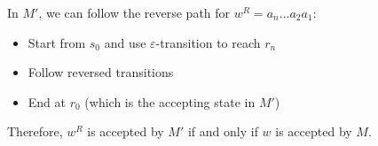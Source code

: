 \documentclass{article}
\begin{document}
In $M'$, we can follow the reverse path for $w^R = a_n...a_2a_1$:
\begin{itemize}
    \item Start from $s_0$ and use $\varepsilon$-transition to reach $r_n$
    \item Follow reversed transitions
    \item End at $r_0$ (which is the accepting state in $M'$)
\end{itemize}

Therefore, $w^R$ is accepted by $M'$ if and only if $w$ is accepted by $M$.
\end{document}
